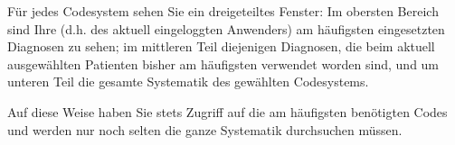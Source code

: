 Für jedes Codesystem sehen Sie ein dreigeteiltes Fenster: Im obersten Bereich sind Ihre (d.h. des aktuell eingeloggten Anwenders) am häufigsten eingesetzten Diagnosen zu sehen; im mittleren Teil diejenigen Diagnosen, die beim aktuell ausgewählten Patienten bisher am häufigsten verwendet worden sind, und um unteren Teil die gesamte Systematik des gewählten Codesystems.

\medskip

Auf diese Weise haben Sie stets Zugriff auf die am häufigsten benötigten Codes und werden nur noch selten die ganze Systematik durchsuchen müssen.

